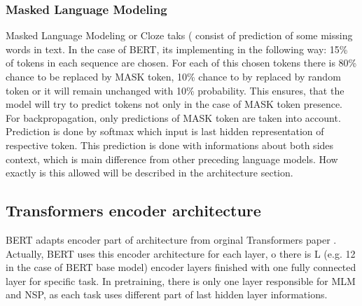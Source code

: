 \subsubsection*{Masked Language Modeling}
Masked Language Modeling or Cloze taks (%
consist of prediction of some missing words in text. In the case of BERT, its implementing in the following way: 15\% of tokens in each sequence are chosen. For each of this chosen tokens there is 80\% chance to be replaced by MASK token, 10\% chance to by replaced by random token or it will remain unchanged with 10\% probability. This ensures, that the model will try to predict tokens not only in the case of MASK token presence. For backpropagation, only predictions of MASK token are taken into account. Prediction is done by softmax which input is last hidden representation of respective token. This prediction is done with informations about both sides context, which is main difference from other preceding language models. How exactly is this allowed will be described in the architecture section.

\subsection{Transformers encoder architecture}
BERT adapts encoder part of architecture from orginal Transformers paper %
.
Actually, BERT uses this encoder architecture for each layer, 
 o there is L (e.g. 12 in the case of BERT base model) encoder layers finished with one fully connected layer for specific task. In pretraining, there is only one layer responsible for MLM and NSP, as each task uses different part of last hidden layer informations. %
 
